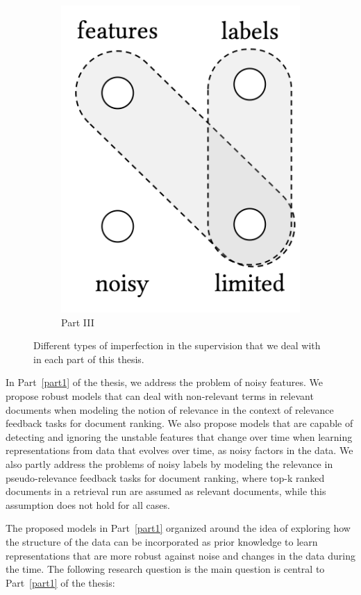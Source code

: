 \begin{figure}[t]
\begin{subfigure}[b]{0.32\textwidth}
        \includegraphics[width=0.55\linewidth]{01-introduction/figs_and_tables/fig_p3.png}
        \caption{\label{fig:p3}Part III}
    \end{subfigure}
\caption{\label{fig:thesis_parts}Different types of imperfection in the supervision that we deal with in each part of this thesis.}
\end{figure}

\bigskip
In Part~\ref{part1} of the thesis, we address the problem of noisy features. We propose robust models that can deal with non-relevant terms in relevant documents when modeling the notion of relevance in the context of relevance feedback tasks for document ranking. We also propose models that are capable of detecting and ignoring the unstable features that change over time when learning representations from data that evolves over time, as noisy factors in the data. We also partly address the problems of noisy labels by modeling the relevance in pseudo-relevance feedback tasks for document ranking, where top-k ranked documents in a retrieval run are assumed as relevant documents, while this assumption does not hold for all cases.

The proposed models in Part~\ref{part1} organized around the idea of exploring how the structure of the data can be incorporated as prior knowledge to learn representations that are more robust against noise and changes in the data during the time. 
The following research question is the main question is central to Part~\ref{part1} of the thesis:

